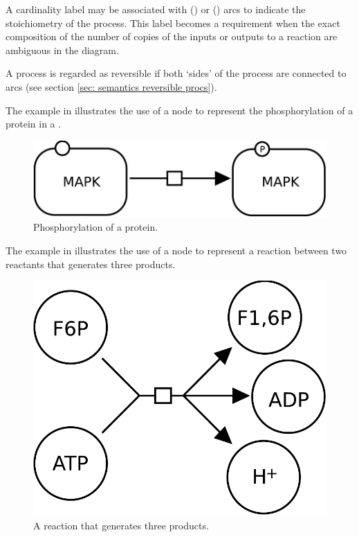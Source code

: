 A cardinality label may be associated with  () or  () arcs to indicate the stoichiometry of the process.  This label becomes a requirement when the exact composition of the number of copies of the inputs or outputs to a reaction are ambiguous in the diagram.

A process is regarded as reversible if both `sides' of the process are connected to  arcs (see section \ref{sec: semantics reversible procs}).

The example in  illustrates the use of a  node to represent the phosphorylation of a protein in a \PD.

\begin{figure}[H]
  \centering
  \includegraphics[scale = 0.3]{examples/process-phosphorylation}
  \caption{Phosphorylation of a protein.}
  \label{fig:trans-phos}
\end{figure}

The example in  illustrates the use of a  node to represent a reaction between two reactants that generates three products. 

\begin{figure}[H]
  \centering
  \includegraphics[scale = 0.3]{examples/process-reaction}
  \caption{A reaction that generates three products.}
  \label{fig:trans-react}
\end{figure}

